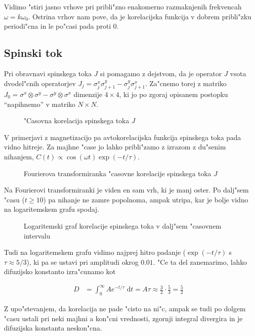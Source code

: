 \documentclass[a4paper,10pt]{article}
\begin{document}
Vidimo "stiri jasno vrhove pri pribli"zno enakomerno razmaknjenih frekvencah $\omega = k \omega_0$. 
Ostrina vrhov nam pove, da je korelacijska funkcija v dobrem pribli"zku periodi"cna in le po"casi pada proti 0. 

\subsection{Spinski tok}

Pri obravnavi spinskega toka $J$ si pomagamo z dejstvom, da je operator $J$ vsota dvodel"cnih operatorjev $J_j = \sigma_j^x \sigma_{j+1}^y - \sigma_j^y \sigma_{j+1}^x$. 
Za"cnemo torej z matriko $J_0 = \sigma^x \otimes \sigma^y - \sigma^y \otimes \sigma^x$ dimenzije $4\times 4$, ki jo po zgoraj opisanem postopku ``napihnemo'' v matriko $N\times N$. 

\begin{figure}[H]
\centering
 
 \caption{"Casovna korelacija spinskega toka $J$}
\end{figure}

V primerjavi z magnetizacijo pa avtokorelacijska funkcija spinskega toka pada vidno hitreje. 
Za majhne "case jo lahko pribli"zamo z izrazom z du"senim nihanjem, $C(t) \propto \cos(\omega t) \exp(-t/\tau)$. 

\begin{figure}[H]
\centering
 
 \caption{Fourierova transformiranka "casovne korelacije spinskega toka $J$}
\end{figure}

Na Fourierovi transformiranki je viden en sam vrh, ki je manj oster. Po dalj"sem "casu ($t\geq 10$) pa nihanje ne zamre popolnoma, ampak utripa, kar je bolje vidno na logaritemskem grafu spodaj. 

\begin{figure}[H]
 \centering

\caption{Logaritemski graf korelacije spinskega toka v dalj"sem "casovnem intervalu}
\end{figure}

Tudi na logaritemskem grafu vidimo najprej hitro padanje ($\exp(-t/\tau)$ s $\tau\approx 5/3$), ki pa se ustavi pri amplitudi okrog $0.01$. 
"Ce ta del zanemarimo, lahko difuzijsko konstanto izra"cunamo kot

\begin{align}
 D &= \int_0^{\infty} Ae^{-t/\tau} \; \mathrm{d}t = A\tau \approx \frac{3}{2} \cdot \frac{5}{3} = \frac{5}{2}
\end{align}

Z upo"stevanjem, da korelacija ne pade "cisto na ni"c, ampak se tudi po dolgem "casu ustali pri neki majhni a kon"cni vrednosti, zgornji integral divergira in je difuzijska konstanta neskon"cna. 
\end{document}

